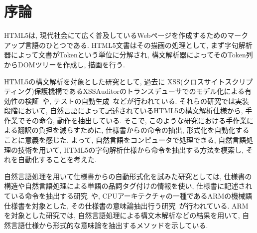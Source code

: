 \documentclass[uplatex,a4j]{jsreport}
\begin{document}
\chapter{序論}

HTML5は, 現代社会にて広く普及しているWebページを作成するためのマークアップ言語のひとつである.
HTML5文書はその描画の処理として, まず字句解析器によって文書がTokenという単位に分解され, 構文解析器によってそのToken列からDOMツリーを作成し, 描画を行う.%

HTML5の構文解析を対象とした研究として, 過去に
XSS(クロスサイトスクリプティング)保護機構であるXSSAuditorのトランスデューサでのモデル化による有効性の検証~\cite{XSSAuditor,トランスデューサの包含関係}や, 
テストの自動生成~\cite{HTML5Testing}などが行われている. 
それらの研究では実装段階において, 自然言語によって記述されているHTML5の構文解析仕様から, 手作業でその命令, 動作を抽出している. 
そこで, このような研究における手作業による翻訳の負担を減らすために, 仕様書からの命令の抽出,  形式化を自動化することに意義を感じた. 
よって, 自然言語をコンピュータで処理できる, 自然言語処理の技術を用いて, HTML5の字句解析仕様から命令を抽出する方法を模索し, それを自動化することを考えた.

自然言語処理を用いて仕様書からの自動形式化を試みた研究としては, 
仕様書の構造や自然言語処理による単語の品詞タグ付けの情報を使い, 仕様書に記述されている命令を抽出する研究~\cite{7272551}や, 
CPUアーキテクチャの一種であるARMの機械語仕様書を対象とした, その仕様書の意味論抽出行う研究~\cite{arm}が行われている. 
ARMを対象とした研究では, 自然言語処理による構文木解析などの結果を用いて, 自然言語仕様から形式的な意味論を抽出するメソッドを示している. 
\end{document}
